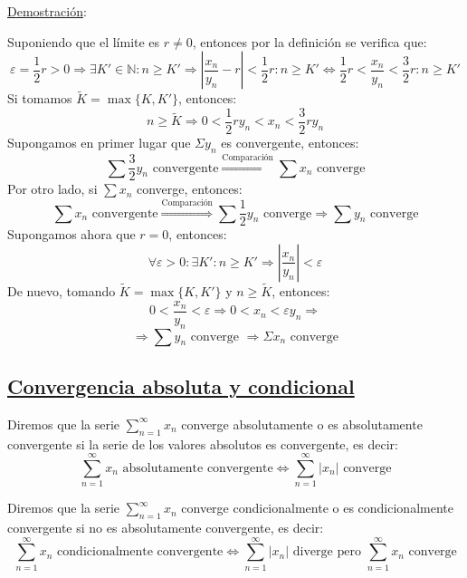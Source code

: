 \documentclass[10pt,a4paper,openright]{book}
\begin{document}
\underline{Demostración}:

Suponiendo que el límite es $r \neq 0$, entonces por la definición se verifica que:
$$\varepsilon = \frac{1}{2} r>0 \Rightarrow \exists K' \in \mathbb{N} : n \geq K' \Rightarrow | \frac{x_n}{y_n} - r|< \frac{1}{2} r : n \geq K' \Leftrightarrow \frac{1}{2} r <\frac{x_n}{y_n} < \frac{3}{2} r : n \geq K'$$
Si tomamos $\tilde{K} = \max \{K, K'\}$, entonces:
$$n \geq \tilde{K} \Rightarrow 0 <\frac{1}{2} r y_n < x_n < \frac{3}{2} r y_n $$
Supongamos en primer lugar que $\Sigma y_n$ es convergente, entonces:
$$\sum \frac{3}{2} y_n\mbox{ convergente} \overset{\mbox{Comparación}}{\Rightarrow} \sum x_n \mbox{ converge}$$
Por otro lado, si $\sum x_n$ converge, entonces:
$$\sum x_n\mbox{ convergente} \overset{\mbox{Comparación}}{\Rightarrow} \sum \frac{1}{2} y_n \mbox{ converge}\Rightarrow \sum y_n\mbox{ converge}$$
Supongamos ahora que $r=0$, entonces:
$$\forall \varepsilon >0: \exists K': n \geq K' \Rightarrow |\frac{x_n}{y_n}| < \varepsilon$$
De nuevo, tomando $\tilde{K} = \max \{K, K'\}$ y $n \geq \tilde{K}$, entonces:
$$0 < \frac{x_n}{y_n} < \varepsilon \Rightarrow 0 < x_n < \varepsilon y_n \Rightarrow$$
$$\Rightarrow \sum y_n \mbox{ converge }\Rightarrow \Sigma x_n \mbox{ converge}$$

\subsection*{\underline{Convergencia absoluta y condicional}}
Diremos que la serie $\sum_{n = 1}^{\infty} x_n$ converge absolutamente o es absolutamente convergente si la serie de los valores absolutos es convergente, es decir:
$$\sum_{n = 1}^{\infty} x_n\mbox{ absolutamente convergente} \Leftrightarrow \sum_{n=1}^{\infty} |x_n|\mbox{ converge}$$

Diremos que la serie $\sum_{n = 1}^{\infty} x_n$ converge condicionalmente o es condicionalmente convergente si no es absolutamente convergente, es decir:
$$\sum_{n = 1}^{\infty} x_n\mbox{ condicionalmente convergente} \Leftrightarrow \sum_{n=1}^{\infty} |x_n|\mbox{ diverge pero } \sum_{n = 1}^{\infty} x_n \mbox{ converge}$$
\end{document}
